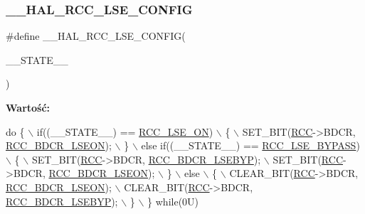 \subsubsection{\texorpdfstring{\+\_\+\+\_\+\+H\+A\+L\+\_\+\+R\+C\+C\+\_\+\+L\+S\+E\+\_\+\+C\+O\+N\+F\+IG}{\_\_HAL\_RCC\_LSE\_CONFIG}}
{\footnotesize\ttfamily \#define \+\_\+\+\_\+\+H\+A\+L\+\_\+\+R\+C\+C\+\_\+\+L\+S\+E\+\_\+\+C\+O\+N\+F\+IG(\begin{DoxyParamCaption}\item[{}]{\+\_\+\+\_\+\+S\+T\+A\+T\+E\+\_\+\+\_\+ }\end{DoxyParamCaption})}

{\bfseries Wartość\+:}
\begin{DoxyCode}
\textcolor{keywordflow}{do} \{                                       \(\backslash\)
                      if((\_\_STATE\_\_) == \hyperlink{group___r_c_c___l_s_e___config_gac981ea636c2f215e4473901e0912f55a}{RCC\_LSE\_ON})            \(\backslash\)
                      \{                                        \(\backslash\)
                        SET\_BIT(\hyperlink{group___peripheral__declaration_ga74944438a086975793d26ae48d5882d4}{RCC}->BDCR, \hyperlink{group___peripheral___registers___bits___definition_ga00145f8814cb9a5b180d76499d97aead}{RCC\_BDCR\_LSEON});    \(\backslash\)
                      \}                                        \(\backslash\)
                      else \textcolor{keywordflow}{if}((\_\_STATE\_\_) == \hyperlink{group___r_c_c___l_s_e___config_gaad580157edbae878edbcc83c5a68e767}{RCC\_LSE\_BYPASS})   \(\backslash\)
                      \{                                        \(\backslash\)
                        SET\_BIT(\hyperlink{group___peripheral__declaration_ga74944438a086975793d26ae48d5882d4}{RCC}->BDCR, \hyperlink{group___peripheral___registers___bits___definition_ga542dffd7f8dc4da5401b54d822a22af0}{RCC\_BDCR\_LSEBYP});   \(\backslash\)
                        SET\_BIT(\hyperlink{group___peripheral__declaration_ga74944438a086975793d26ae48d5882d4}{RCC}->BDCR, \hyperlink{group___peripheral___registers___bits___definition_ga00145f8814cb9a5b180d76499d97aead}{RCC\_BDCR\_LSEON});    \(\backslash\)
                      \}                                        \(\backslash\)
                      else                                     \(\backslash\)
                      \{                                        \(\backslash\)
                        CLEAR\_BIT(\hyperlink{group___peripheral__declaration_ga74944438a086975793d26ae48d5882d4}{RCC}->BDCR, \hyperlink{group___peripheral___registers___bits___definition_ga00145f8814cb9a5b180d76499d97aead}{RCC\_BDCR\_LSEON});  \(\backslash\)
                        CLEAR\_BIT(\hyperlink{group___peripheral__declaration_ga74944438a086975793d26ae48d5882d4}{RCC}->BDCR, \hyperlink{group___peripheral___registers___bits___definition_ga542dffd7f8dc4da5401b54d822a22af0}{RCC\_BDCR\_LSEBYP}); \(\backslash\)
                      \}                                        \(\backslash\)
                    \} \textcolor{keywordflow}{while}(0U)
\end{DoxyCode}


